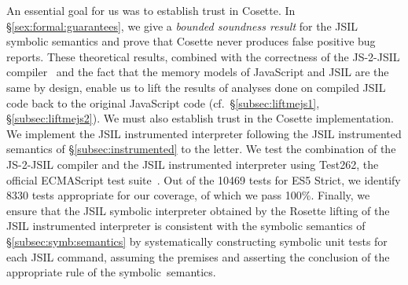 \documentclass[sigconf, review]{acmart}
\newcommand{\jsil}{JSIL\xspace}
\newcommand{\JSComp}{JS-2-JSIL\xspace}
\newcommand{\polish}[1]{{\color{red}#1}}
\newcommand{\cosette}{Cosette\xspace}
\newcommand{\pgmaxinline}[1]{ {\color{purple} *** PG : #1 ***} }
\begin{document}










An essential goal for us was to establish trust in Cosette. In
\S\ref{sex:formal:guarantees}, we give a {\em bounded soundness
  result} for the \jsil symbolic semantics and prove that \cosette
never produces false positive bug reports. These theoretical results,
combined with the correctness of the \JSComp compiler~\cite{.}
and the fact that the memory models of JavaScript and \jsil are the
same by design, enable us to lift the results of analyses done on
compiled \jsil code back to the original JavaScript code
(cf.~\S\ref{subsec:liftmejs1}, \S\ref{subsec:liftmejs2}). We must also
establish trust in the Cosette implementation. 
We  implement the \jsil  instrumented interpreter following the \jsil 
instrumented semantics of \S\ref{subsec:instrumented} to the letter.
We test the combination of the 
JS-2-JSIL compiler and the \jsil instrumented  interpreter using Test262, 
the official ECMAScript test suite~\cite{test262}. Out of the
10469 tests for ES5 Strict, we identify 8330 tests appropriate
for our coverage, of which we pass 100\%.
Finally, we ensure that the \jsil symbolic interpreter obtained by the 
Rosette lifting of the \jsil instrumented interpreter is consistent 
with the symbolic semantics of \S\ref{subsec:symb:semantics}
by systematically constructing symbolic unit tests for each \jsil command,
assuming the premises and asserting the conclusion of the 
appropriate rule of the symbolic~semantics. 





\end{document}
